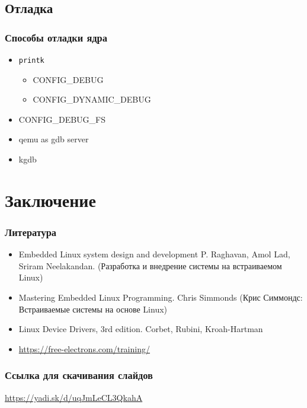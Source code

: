 \subsection{Отладка}
\begin{frame}
  \frametitle{Способы отладки ядра}
  \begin{itemize}
    \item \texttt{printk} 
      \begin{itemize}
          \item CONFIG\_DEBUG
          \item CONFIG\_DYNAMIC\_DEBUG
      \end{itemize}
    \item CONFIG\_DEBUG\_FS
    \item qemu as gdb server
    \item kgdb
  \end{itemize}
\end{frame}

\section{Заключение}
\begin{frame}
  \frametitle{Литература}
  \begin{itemize}
    \item  Embedded Linux system design and development  P. Raghavan, Amol Lad, Sriram Neelakandan. (Разработка и внедрение системы на встраиваемом Linux)
    \item Mastering Embedded Linux Programming. Chris Simmonds (Крис Симмондс: Встраиваемые системы на основе Linux)
    \item Linux Device Drivers, 3rd edition. Corbet, Rubini, Kroah-Hartman 
    \item \url{https://free-electrons.com/training/}
  \end{itemize}
\end{frame}

\begin{frame}
  \frametitle{Ссылка для скачивания слайдов}
  \begin{center}
    \url{https://yadi.sk/d/uqJmLeCL3QkahA}
  \end{center}
\end{frame}


